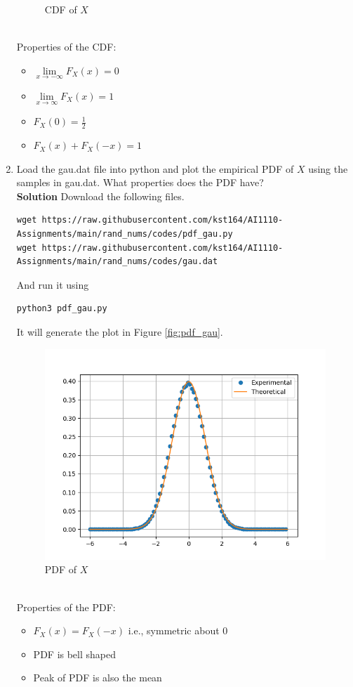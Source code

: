 \documentclass[journal, 12pt, twocolumn]{IEEEtran}
\begin{document}
\begin{enumerate}[label=\arabic{section}.\arabic*]
\begin{figure}[!ht]
            \caption{CDF of $X$}
            \label{fig:cdf_gau}
        \end{figure}
        \\
        Properties of the CDF:
        \begin{itemize}
            \item $\lim\limits_{x \to -\infty} F_X(x) = 0$
            \item $\lim\limits_{x \to \infty} F_X(x) = 1$
            \item $F_X(0) = \frac{1}{2}$
            \item $F_X(x) + F_X(-x) = 1$
        \end{itemize}

    \item
        Load the gau.dat file into python and plot the empirical PDF of $X$ using the samples in gau.dat.
        What properties does the PDF have?
        \\
        \textbf{Solution} Download the following files.
        \begin{lstlisting}
wget https://raw.githubusercontent.com/kst164/AI1110-Assignments/main/rand_nums/codes/pdf_gau.py
wget https://raw.githubusercontent.com/kst164/AI1110-Assignments/main/rand_nums/codes/gau.dat
        \end{lstlisting}
        And run it using
        \begin{lstlisting}
python3 pdf_gau.py
        \end{lstlisting}
        It will generate the plot in Figure \eqref{fig:pdf_gau}.
        \begin{figure}[!ht]
            \includegraphics[width=\columnwidth]{figs/pdf_gau.png}
            \caption{PDF of $X$}
            \label{fig:pdf_gau}
        \end{figure}
        \\
        Properties of the PDF:
        \begin{itemize}
            \item $F_X(x) = F_X(-x)$ i.e., symmetric about 0
            \item PDF is bell shaped
            \item Peak of PDF is also the mean
        \end{itemize}


\end{enumerate}
\end{document}
